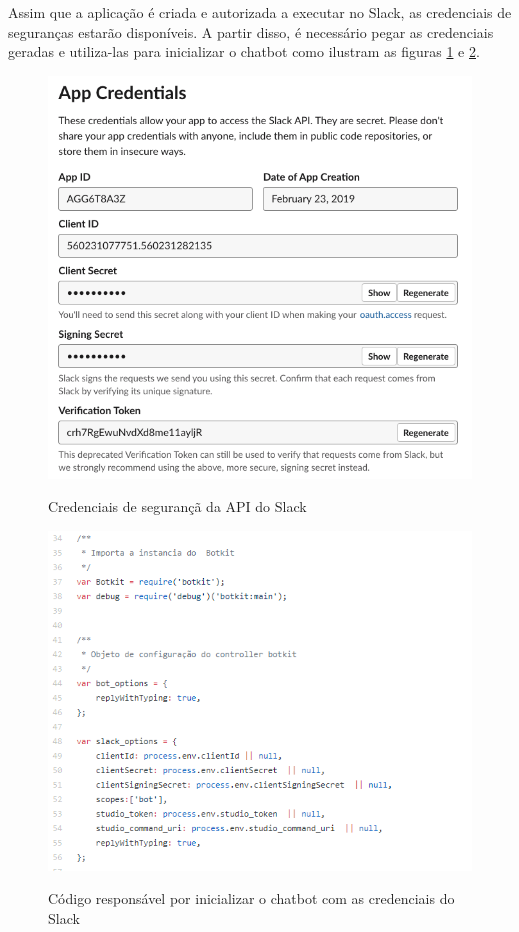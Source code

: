 Assim que a aplicação é criada e autorizada a executar no Slack, as credenciais de seguranças estarão disponíveis. A partir disso, é necessário pegar as credenciais geradas e utiliza-las para inicializar o chatbot como ilustram as figuras \ref{token} e \ref{token_codigo}.

\begin{figure}[H]
  \centering
   \caption{Credenciais de segurançã da API do Slack}
  \includegraphics[scale=0.5]{Imagens/slack_token.png} 
  \label{token}
\end{figure}



\begin{figure}[H]
  \centering
   \caption{Código responsável por inicializar o chatbot com as credenciais do Slack}
  \includegraphics[scale=0.8]{Imagens/config.png} 
  \label{token_codigo}
\end{figure}



